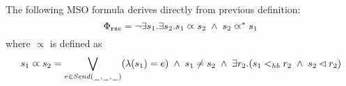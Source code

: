 
The following MSO formula derives directly from previous  definition:
\[\Phi_{\mathtt{rsc}} = \neg \exists s_1.\exists s_2. s_1 \varpropto s_2 \;\wedge\; s_2 \varpropto^\ast s_1
\]
\noindent where $\varpropto$ is defined as
\[
s_1 \varpropto s_2 =
\bigvee_{\substack{e \in {\mathit{Send}(\hspace{0.1em}\underline{\hspace{0.5em}}\hspace{0.1em},\hspace{0.1em}\underline{\hspace{0.5em}}\hspace{0.1em},\hspace{0.1em}\underline{\hspace{0.5em}}\hspace{0.1em})}}}(\lambda(s_1) = e) \;\wedge\;
s_1 \neq s_2 \;\wedge\;
\exists r_2. (s_1 <_{hb} r_2 \;\wedge\; s_2 \lhd r_2)
\]


